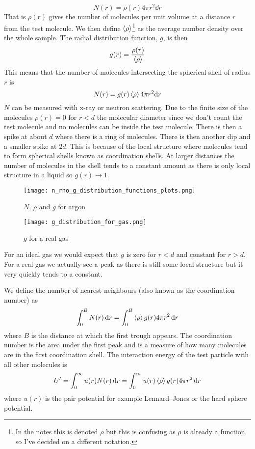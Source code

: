 \documentclass{article}
\begin{document}
    \[N(r) = \rho(r)4\pi r^2\dd r\]
    That is \(\rho(r)\) gives the number of molecules per unit volume at a distance \(r\) from the test molecule.
    We then define \(\left\langle{\rho}\right\rangle\)\footnote{In the notes this is denoted \(\rho\) but this is confusing as \(\rho\) is already a function so I've decided on a different notation.} as the average number density over the whole sample.
    The radial distribution function, \(g\), is then
    \[g(r) = \frac{\rho(r)}{\left\langle{\rho}\right\rangle}\]
    This means that the number of molecules intersecting the spherical shell of radius \(r\) is
    \[N(r) = g(r)\left\langle{\rho}\right\rangle 4\pi r^2\dd r\]
    \(N\) can be measured with x-ray or neutron scattering.
    Due to the finite size of the molecules \(\rho(r) = 0\) for \(r < d\) the molecular diameter since we don't count the test molecule and no molecules can be inside the test molecule.
    There is then a spike at about \(d\) where there is a ring of molecules.
    There is then another dip and a smaller spike at \(2d\).
    This is because of the local structure where molecules tend to form spherical shells known as coordination shells.
    At larger distances the number of molecules in the shell tends to a constant amount as there is only local structure in a liquid so \(g(r)\to 1\).
    \begin{figure}[ht]
        \centering
        \texttt{[image: n\_rho\_g\_distribution\_functions\_plots.png]}
        \caption{\(N\), \(\rho\) and \(g\) for argon}
    \end{figure}
    \begin{figure}[ht]
        \centering
        \texttt{[image: g\_distribution\_for\_gas.png]}
        \caption{\(g\) for a real gas}
    \end{figure}
    For an ideal gas we would expect that \(g\) is zero for \(r < d\) and constant for \(r > d\).
    For a real gas we actually see a peak as there is still some local structure but it very quickly tends to a constant.
    
    We define the number of nearest neighbours (also known as the coordination number) as
    \[\int_0^BN(r)\,\dd r = \int_0^B\left\langle{\rho}\right\rangle g(r)4\pi r^2\,\dd r\]
    where \(B\) is the distance at which the first trough appears.
    The coordination number is the area under the first peak and is a measure of how many molecules are in the first coordination shell.
    The interaction energy of the test particle with all other molecules is
    \[U' = \int_0^\infty u(r)N(r)\,\dd r = \int_0^\infty u(r)\left\langle{\rho}\right\rangle g(r)4\pi r^2\,\dd r\]
    where \(u(r)\) is the pair potential for example Lennard--Jones or the hard sphere potential.
    
\end{document}
